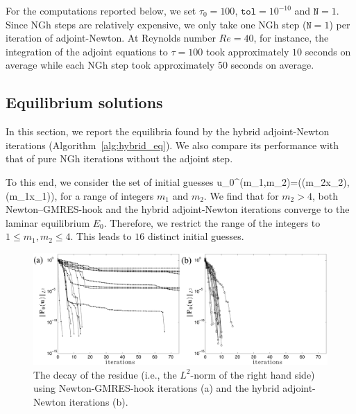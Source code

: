 \documentclass{article}
\begin{document}
For the computations reported below, we set $\tau_0=100$, $\texttt{tol}=10^{-10}$ and
$\texttt{N}=1$. Since NGh steps are relatively expensive, we only take one NGh step
($\texttt{N}=1$) per iteration of
adjoint-Newton.
At Reynolds number $Re=40$, for instance, the integration of the adjoint equations
to $\tau=100$
took approximately $10$ seconds on average while each NGh step took approximately $50$ seconds
on average.

\subsection{Equilibrium solutions}
In this section, we report the equilibria found by the hybrid adjoint-Newton iterations
(Algorithm~\ref{alg:hybrid_eq}).
We also compare its performance with that of pure NGh iterations without the
adjoint step.

To this end, we consider the set of initial guesses
\beq
\vc u_0^{(m_1,m_2)}=\big(\cos(m_2x_2),\cos(m_1x_1)\big),
\label{eq:ig}
\eeq
for a range of integers $m_1$ and $m_2$. We find that for $m_2>4$, both Newton--GMRES-hook
and the hybrid adjoint-Newton iterations converge to the laminar equilibrium $E_0$. Therefore, we
restrict the range of the integers to $1\leq m_1,m_2\leq 4$. This leads to $16$ distinct
initial guesses.
%
\begin{figure}
\centering
\includegraphics[width=\textwidth]{R40_error}
\caption{The decay of the residue (i.e., the $L^2$-norm of the right hand side) using
Newton-GMRES-hook iterations (a) and the hybrid
adjoint-Newton iterations (b).}
\label{fig:NGh_vs_adjN}
\end{figure}
\end{document}
